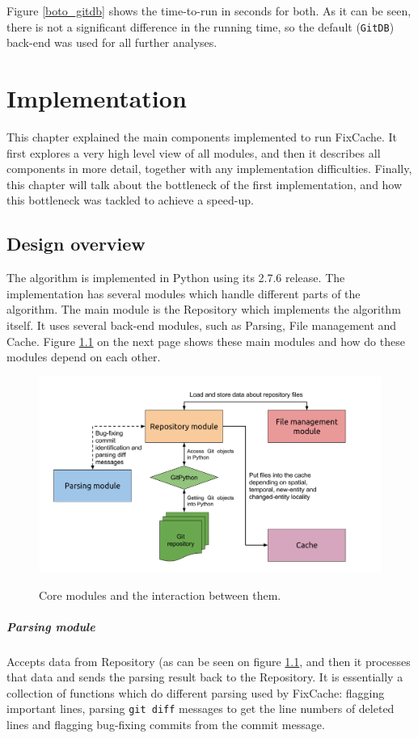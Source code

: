 \documentclass[12pt,twoside,notitlepage]{report}
\newcommand{\fxch}{FixCache}
\begin{document}
Figure \ref{boto_gitdb} shows the time-to-run in seconds for both. As it can be seen, there is not a significant difference in the running time, so the default (\texttt{GitDB}) back-end was used for all further analyses.
\cleardoublepage
\chapter{Implementation}
This chapter explained the main components implemented to run \fxch{}. It first explores a very high level view of all modules, and then it describes all components in more detail, together with any implementation difficulties. Finally, this chapter will talk about the bottleneck of the first implementation, and how this bottleneck was tackled to achieve a speed-up.
\section{Design overview}

The algorithm is implemented in Python using its 2.7.6 release. The implementation has several modules which handle different parts of the algorithm. The main module is the Repository which implements the algorithm itself. It uses several back-end modules, such as Parsing, File management and Cache. Figure \ref{fixcache_flowgraph} on the next page shows these main modules and how do these modules depend on each other.

\begin{figure}[h]
\includegraphics[width=1.0\textwidth]{fixcache_flowgraph.png}
\label{fixcache_flowgraph}
\caption{Core modules and the interaction between them.}
\end{figure} 

\paragraph{Parsing module}Accepts data from Repository (as can be seen on figure \ref{fixcache_flowgraph}, and then it processes that data and sends the parsing result back to the Repository. It is essentially a collection of functions which do different parsing used by \fxch{}: flagging important lines, parsing \texttt{git diff} messages to get the line numbers of deleted lines and flagging bug-fixing commits from the commit message.
\end{document}
